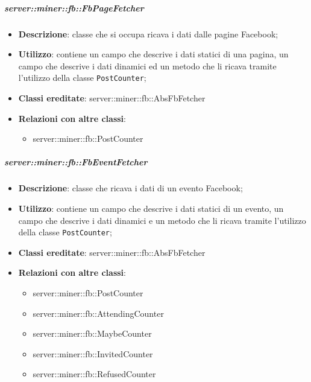 		\subparagraph{server::miner::fb::FbPageFetcher} %
		\label{subp:server_miner_fb_FbPageFetcher}
			\begin{itemize}
				\item \textbf{Descrizione}: classe che si occupa ricava i dati dalle pagine Facebook;
				\item \textbf{Utilizzo}: contiene un campo che descrive i dati statici di una pagina, un campo che descrive i dati dinamici ed un metodo che li ricava tramite l'utilizzo della classe \texttt{PostCounter};
				\item \textbf{Classi ereditate}: server::miner::fb::AbsFbFetcher
				\item \textbf{Relazioni con altre classi}:
					\begin{itemize}
						\item server::miner::fb::PostCounter
					\end{itemize}
			\end{itemize}

		\subparagraph{server::miner::fb::FbEventFetcher} %
		\label{subp:server_miner_fb_FbEventFetcher}
			\begin{itemize}
				\item \textbf{Descrizione}: classe che ricava i dati di un evento Facebook;
				\item \textbf{Utilizzo}: contiene un campo che descrive i dati statici di un evento, un campo che descrive i dati dinamici e un metodo che li ricava tramite l'utilizzo della classe \texttt{PostCounter};
				\item \textbf{Classi ereditate}: server::miner::fb::AbsFbFetcher
				\item \textbf{Relazioni con altre classi}:
					\begin{itemize}
						\item server::miner::fb::PostCounter
						\item server::miner::fb::AttendingCounter
						\item server::miner::fb::MaybeCounter
						\item server::miner::fb::InvitedCounter
						\item server::miner::fb::RefusedCounter
					\end{itemize}
			\end{itemize}

